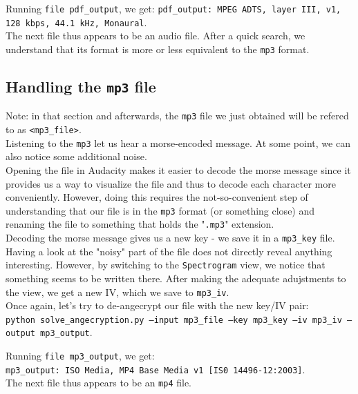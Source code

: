 \documentclass[12pt,a4paper]{article}
\begin{document}
    Running \texttt{file pdf\_output}, we get: \texttt{pdf\_output: MPEG ADTS,
    layer III, v1, 128 kbps, 44.1 kHz, Monaural}.\\
    The next file thus appears to be an audio file. After a quick search, we
    understand that its format is more or less equivalent to the \texttt{mp3} format.


    \subsection{Handling the \texttt{mp3} file}
    Note: in that section and afterwards, the \texttt{mp3} file we just
    obtained will be refered to as \texttt{<mp3\_file>}.\\
    
    Listening to the \texttt{mp3} let us hear a morse-encoded message. At some
    point, we can also notice some additional noise.\\
    Opening the file in Audacity makes it easier to decode the morse message
    since it provides us a way to visualize the file and thus to decode each
    character more conveniently. However, doing this requires the
    not-so-convenient step of understanding that our file is in the
    \texttt{mp3} format (or something close) and renaming the file to something
    that holds the "\texttt{.mp3}" extension.\\
    Decoding the morse message gives us a new key - we save it
    in a \texttt{mp3\_key} file.\\

    Having a look at the "noisy" part of the file does not directly reveal
    anything interesting. However, by switching to the \texttt{Spectrogram}
    view, we notice that something seems to be written there. After making the
    adequate adujstments to the view, we get a new IV, which we save to
    \texttt{mp3\_iv}.\\

    Once again, let's try to de-angecrypt our file with the new key/IV pair:\\
    \texttt{python solve\_angecryption.py --input mp3\_file --key mp3\_key --iv
    mp3\_iv --output mp3\_output}.


    Running \texttt{file mp3\_output}, we get:\\
    \texttt{mp3\_output: ISO Media, MP4 Base Media v1 [IS0 14496-12:2003]}.\\
    The next file thus appears to be an \texttt{mp4} file.
   
\end{document}
